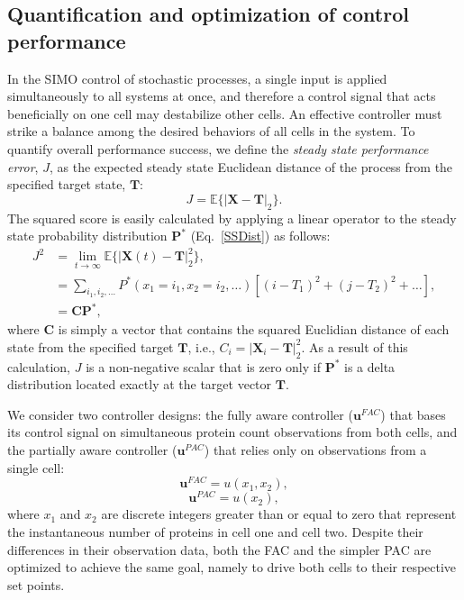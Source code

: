 \documentclass[12pt]{iopart}
\begin{document}
\subsection{Quantification and optimization of control performance}\label{sec:Quantification}
In the SIMO control of stochastic processes, a single input is applied simultaneously to all systems at once, and therefore a control signal that acts beneficially on one cell may destabilize other cells. 
An effective controller must strike a balance among the desired behaviors of all cells in the system. 
To quantify overall performance success, we define the {\em steady state performance error}, $J$, as the expected steady state Euclidean distance of the process from the specified target state, $\mathbf{T}$:
 \begin{equation}
 J = \mathbb{E}\{|\mathbf{X}-\mathbf{T}|_2\}.
 \end{equation}
The squared score is easily calculated by applying a linear operator to the steady state probability distribution $\mathbf{P}^*$ (Eq.\ \ref{SSDist}) as follows:
\begin{eqnarray}
J^2&= \lim_{t\rightarrow \infty}\mathbb{E}\{|\mathbf{X}(t)-\mathbf{T}|_2^2\}, \nonumber \\ 
&=\sum_{i_1,i_2,\ldots} P^*(x_1=i_1,x_2=i_2,\ldots) \left[(i- T_1)^2 + (j- T_2)^2 +\ldots\right],\nonumber  \\
&=\mathbf{C}\mathbf{P}^*,
\label{Euclid} 
\end{eqnarray}
where $\mathbf{C}$ is simply a vector that contains the squared Euclidian distance of each state from the specified target $\mathbf{T}$, i.e., $C_i = |\mathbf{X}_i-\mathbf{T}|_2^2$. 
As a result of this calculation, $J$ is a non-negative scalar that is zero only if $\mathbf{P}^*$ is a delta distribution located exactly at the target vector $\mathbf{T}$.

We consider two controller designs: the fully aware controller ($\mathbf{u}^{FAC}$) that bases its control signal on simultaneous protein count observations from both cells, and the partially aware controller ($\mathbf{u}^{PAC}$) that relies only on observations from a single cell:
\begin{equation}
\mathbf{u}^{FAC}=u(x_1,x_2),
\end{equation}
\begin{equation}
\mathbf{u}^{PAC}=u(x_2),
\end{equation}
where $x_1$ and $x_2$ are discrete integers greater than or equal to zero that represent the instantaneous number of proteins in cell one and cell two. Despite their differences in their observation data, both the FAC and the simpler PAC are optimized to achieve the same goal, namely to drive both cells to their respective set points.
\end{document}

